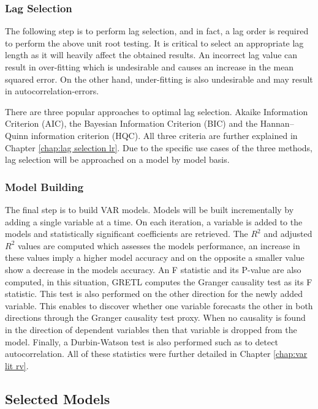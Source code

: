 \subsubsection{Lag Selection}

The following step is to perform lag selection, and in fact, a lag order is required to perform the above unit root testing. It is critical to select an appropriate lag length as it will heavily affect the obtained results. An incorrect lag value can result in over-fitting which is undesirable and causes an increase in the mean squared error. On the other hand, under-fitting is also undesirable and may result in autocorrelation-errors.

There are three popular approaches to optimal lag selection. Akaike Information Criterion (AIC), the Bayesian Information Criterion (BIC) and the Hannan–Quinn information criterion (HQC). All three criteria are further explained in Chapter \ref{chap:lag selection lr}. Due to the specific use cases of the three methods, lag selection will be approached on a model by model basis.

\subsubsection{Model Building}

The final step is to build VAR models. Models will be built incrementally by adding a single variable at a time.  On each iteration, a variable is added to the models and statistically significant coefficients are retrieved. The $R^2$ and adjusted $R^2$ values are computed which assesses the models performance, an increase in these values imply a higher model accuracy and on the opposite a smaller value show a decrease in the models accuracy. An F statistic and its P-value are also computed, in this situation, GRETL computes the Granger causality test as its F statistic. This test is also performed on the other direction for the newly added variable. This enables to discover whether one variable forecasts the other in both directions through the Granger causality test proxy. When no causality is found in the direction of dependent variables then that variable is dropped from the model. Finally, a Durbin-Watson test is also performed such as to detect autocorrelation. All of these statistics were further detailed in Chapter \ref{chap:var lit rv}.

\subsection{Selected Models}

